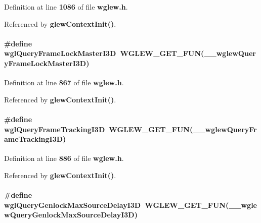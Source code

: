 Definition at line {\bf 1086} of file {\bf wglew.\+h}.



Referenced by {\bf glew\+Context\+Init()}.

\paragraph[{wgl\+Query\+Frame\+Lock\+Master\+I3D}]{\setlength{\rightskip}{0pt plus 5cm}\#define wgl\+Query\+Frame\+Lock\+Master\+I3D~{\bf W\+G\+L\+E\+W\+\_\+\+G\+E\+T\+\_\+\+F\+UN}({\bf \+\_\+\+\_\+wglew\+Query\+Frame\+Lock\+Master\+I3D})}\label{wglew_8h_a2f8fabe7739c6fd4d16ef9b36296ccd0}


Definition at line {\bf 867} of file {\bf wglew.\+h}.



Referenced by {\bf glew\+Context\+Init()}.

\paragraph[{wgl\+Query\+Frame\+Tracking\+I3D}]{\setlength{\rightskip}{0pt plus 5cm}\#define wgl\+Query\+Frame\+Tracking\+I3D~{\bf W\+G\+L\+E\+W\+\_\+\+G\+E\+T\+\_\+\+F\+UN}({\bf \+\_\+\+\_\+wglew\+Query\+Frame\+Tracking\+I3D})}\label{wglew_8h_af12e438c60226956f507df294eb030cd}


Definition at line {\bf 886} of file {\bf wglew.\+h}.



Referenced by {\bf glew\+Context\+Init()}.

\paragraph[{wgl\+Query\+Genlock\+Max\+Source\+Delay\+I3D}]{\setlength{\rightskip}{0pt plus 5cm}\#define wgl\+Query\+Genlock\+Max\+Source\+Delay\+I3D~{\bf W\+G\+L\+E\+W\+\_\+\+G\+E\+T\+\_\+\+F\+UN}({\bf \+\_\+\+\_\+wglew\+Query\+Genlock\+Max\+Source\+Delay\+I3D})}\label{wglew_8h_a4253ec326e49190f6a0f7d5e29ad2834}


